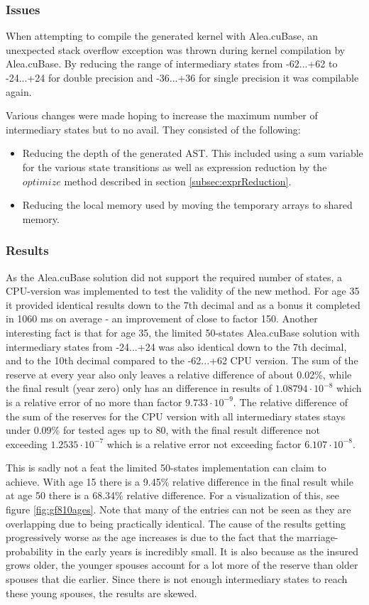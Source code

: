 \subsubsection{Issues}
When attempting to compile the generated kernel with Alea.cuBase, an unexpected stack overflow exception was thrown during kernel compilation by Alea.cuBase.
By reducing the range of intermediary states from -62...+62 to -24...+24 for double precision and -36...+36 for single precision it was compilable again.

Various changes were made hoping to increase the maximum number of intermediary states but to no avail.
They consisted of the following:
\begin{itemize}
\item Reducing the depth of the generated AST. This included using a sum variable for the various state transitions as well as expression reduction by the $optimize$ method described in section \ref{subsec:exprReduction}.
\item Reducing the local memory used by moving the temporary arrays to shared memory.
\end{itemize}

\subsubsection{Results}
As the Alea.cuBase solution did not support the required number of states, a CPU-version was implemented to test the validity of the new method.
For age 35 it provided identical results down to the 7th decimal and as a bonus it completed in 1060 ms on average - an improvement of close to factor 150.
Another interesting fact is that for age 35, the limited 50-states Alea.cuBase solution with intermediary states from -24...+24 was also identical down to the 7th decimal, and to the 10th decimal compared to the -62...+62 CPU version.
The sum of the reserve at every year also only leaves a relative difference of about 0.02\%, while the final result (year zero) only has an difference in results of $1.08794 \cdot 10^{-8}$ which is a relative error of no more than factor $9.733 \cdot 10^{-9}$.
The relative difference of the sum of the reserves for the CPU version with all intermediary states stays under 0.09\% for tested ages up to 80, with the final result difference not exceeding $1.2535 \cdot 10^{-7}$ which is a relative error not exceeding factor $6.107 \cdot 10^{-8}$.

This is sadly not a feat the limited 50-states implementation can claim to achieve. 
With age 15 there is a 9.45\% relative difference in the final result while at age 50 there is a 68.34\% relative difference.
For a visualization of this, see figure \ref{fig:gf810ages}. 
Note that many of the entries can not be seen as they are overlapping due to being practically identical.
The cause of the results getting progressively worse as the age increases is due to the fact that the marriage-probability in the early years is incredibly small.
It is also because as the insured grows older, the younger spouses account for a lot more of the reserve than older spouses that die earlier.
Since there is not enough intermediary states to reach these young spouses, the results are skewed.

